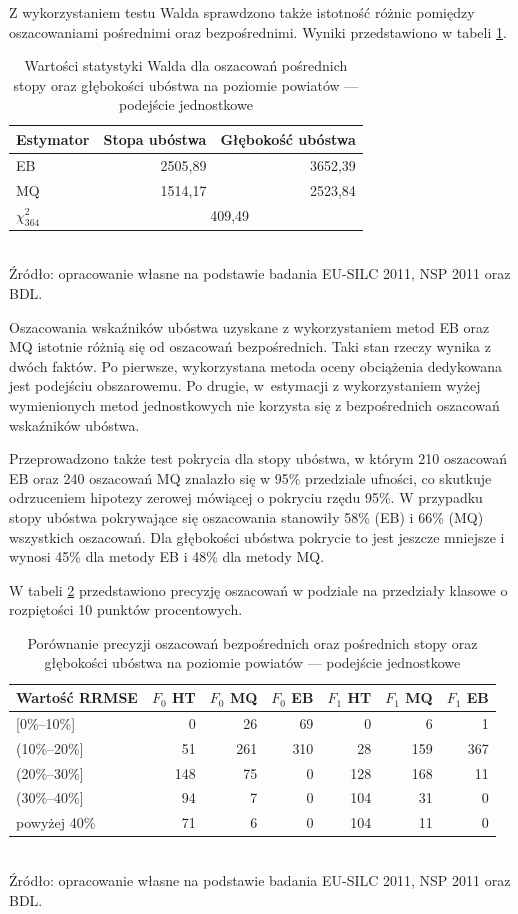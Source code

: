 Z wykorzystaniem testu Walda sprawdzono także istotność różnic pomiędzy oszacowaniami pośrednimi oraz bezpośrednimi. Wyniki przedstawiono w tabeli \ref{tab:wald_pow_eb}.

\begin{table}[htp]
\caption{Wartości statystyki Walda dla oszacowań pośrednich stopy oraz głębokości ubóstwa na poziomie powiatów --- podejście jednostkowe}
\label{tab:wald_pow_eb}
\centering
\begin{tabular}{lrr}
\hline
Estymator & Stopa ubóstwa & Głębokość ubóstwa\tabularnewline
\hline
EB & 2505,89 & 3652,39\tabularnewline
MQ & 1514,17 & 2523,84\tabularnewline
$\chi^2_{364}$ & \multicolumn{2}{c}{409,49} \tabularnewline
\hline
\end{tabular}\\
\small{Źródło: opracowanie własne na podstawie badania EU-SILC 2011, NSP 2011
oraz BDL.}
\end{table}

Oszacowania wskaźników ubóstwa uzyskane z wykorzystaniem metod EB oraz MQ istotnie różnią się od oszacowań bezpośrednich. Taki stan rzeczy wynika z dwóch faktów. Po pierwsze, wykorzystana metoda oceny obciążenia dedykowana jest podejściu obszarowemu. Po drugie, w~estymacji z wykorzystaniem wyżej wymienionych metod jednostkowych nie korzysta się z bezpośrednich oszacowań wskaźników ubóstwa.

Przeprowadzono także test pokrycia dla stopy ubóstwa, w którym 210 oszacowań EB oraz 240 oszacowań MQ znalazło się w 95\% przedziale ufności, co skutkuje odrzuceniem hipotezy zerowej mówiącej o pokryciu rzędu 95\%. W przypadku stopy ubóstwa pokrywające się oszacowania stanowiły 58\% (EB) i 66\% (MQ) wszystkich oszacowań. Dla głębokości ubóstwa pokrycie to jest jeszcze mniejsze i wynosi 45\% dla metody EB i 48\% dla metody MQ.

W tabeli \ref{tab:jedn_prec} przedstawiono precyzję oszacowań w podziale na przedziały klasowe o rozpiętości 10 punktów procentowych.

\begin{table}[htp]
\caption{Porównanie precyzji oszacowań bezpośrednich oraz pośrednich stopy oraz głębokości ubóstwa na poziomie powiatów --- podejście jednostkowe}
\label{tab:jedn_prec}
\centering
\begin{tabular}{lrrrrrr}
\hline
Wartość RRMSE & $F_0$ HT & $F_0$ MQ & $F_0$ EB & $F_1$ HT & $F_1$ MQ & $F_1$ EB \tabularnewline
\hline
{[}0\%--10\%{]} & 0 & 26 & 69 & 0 & 6 & 1 \tabularnewline
(10\%--20\%{]} & 51 & 261 & 310 & 28 & 159 & 367 \tabularnewline
(20\%--30\%{]} & 148 & 75 & 0 & 128 & 168 & 11 \tabularnewline
(30\%--40\%{]} & 94 & 7 & 0 & 104 & 31 & 0 \tabularnewline
powyżej 40\% & 71 & 6 & 0 & 104 & 11 & 0 \tabularnewline
\hline
\end{tabular}\\
\small{Źródło: opracowanie własne na podstawie badania EU-SILC 2011, NSP 2011 oraz BDL.}
\end{table}

